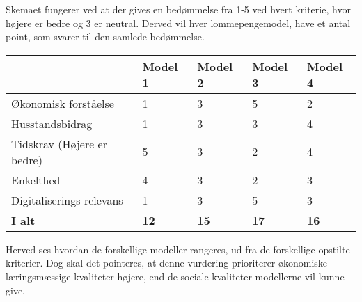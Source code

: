 \noindent Skemaet fungerer ved at der gives en bedømmelse fra 1-5 ved hvert kriterie, hvor højere er bedre og 3 er neutral. Derved vil hver lommepengemodel, have et antal point, som svarer til den samlede bedømmelse.\\

\begin{center}
   \begin{tabular}{| l | l | l | l | l |} 
   \hline
   & \textbf{Model 1} & \textbf{Model 2} & \textbf{Model 3} & \textbf{Model 4} \\ \hline
   Økonomisk forståelse & 1 & 3 & 5 & 2 \\ \hline
   Husstandsbidrag & 1 & 3 & 3 & 4 \\ \hline
   Tidskrav (Højere er bedre) & 5 & 3 & 2 & 4 \\ \hline
   Enkelthed & 4 & 3 & 2 & 3 \\ \hline
   Digitaliserings relevans & 1 & 3 & 5 & 3 \\ \hline
   \textbf{I alt} & \textbf{12} & \textbf{15} & \textbf{17} & \textbf{16} \\ \hline
   \end{tabular}
\end{center}   

Herved ses hvordan de forskellige modeller rangeres, ud fra de forskellige opstilte kriterier.
Dog skal det pointeres, at denne vurdering prioriterer økonomiske læringsmæssige kvaliteter højere, end de sociale kvaliteter modellerne vil kunne give.
